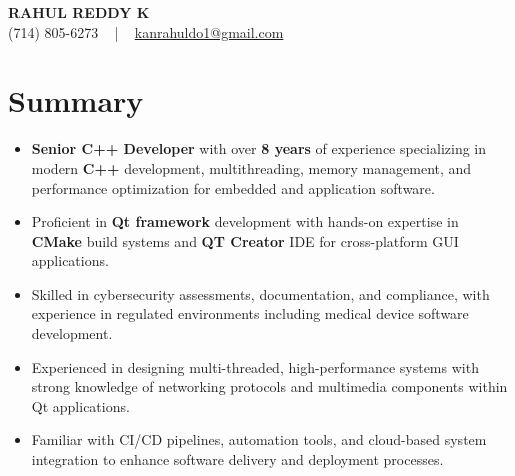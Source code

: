 \documentclass[letterpaper,11pt]{article}
\newcommand{\resumeItem}[1]{
  \item\footnotesize{
    {#1 \vspace{-2pt}}
  }
}
\newcommand{\resumeItemListStart}{\begin{itemize}[leftmargin=*]}
\newcommand{\resumeItemListEnd}{\end{itemize}\vspace{-5pt}}
\begin{document}
\begin{center}
    {\fontsize{14pt}{12pt}\selectfont \textbf{\MakeUppercase{Rahul Reddy K}}}\\ \vspace{2pt}
    \fontsize{10pt}{12pt}\selectfont (714) 805-6273 ~ | ~ \href{mailto:kanrahuldo1@gmail.com}{kanrahuldo1@gmail.com}~
    \vspace{-8pt}
\end{center}

\section{Summary}
\fontsize{9pt}{10pt}\selectfont
\resumeItemListStart
    \resumeItem{\textbf{Senior C++ Developer} with over \textbf{8 years} of experience specializing in modern \textbf{C++} development, multithreading, memory management, and performance optimization for embedded and application software.}
    \resumeItem{Proficient in \textbf{Qt framework} development with hands-on expertise in \textbf{CMake} build systems and \textbf{QT Creator} IDE for cross-platform GUI applications.}
    \resumeItem{Skilled in cybersecurity assessments, documentation, and compliance, with experience in regulated environments including medical device software development.}
    \resumeItem{Experienced in designing multi-threaded, high-performance systems with strong knowledge of networking protocols and multimedia components within Qt applications.}
    \resumeItem{Familiar with CI/CD pipelines, automation tools, and cloud-based system integration to enhance software delivery and deployment processes.}
\resumeItemListEnd
\vspace{-6pt}
\end{document}
